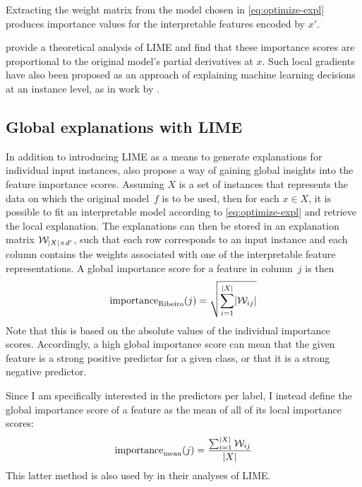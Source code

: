 Extracting the weight matrix from the model chosen in \autoref{eq:optimize-expl} produces importance values for the interpretable features encoded by $x'$.

\citet{garreau2020explaining} provide a theoretical analysis of LIME and find that these importance scores are proportional to the original model's partial derivatives at $x$.
Such local gradients have also been proposed as an approach of explaining machine learning decisions at an instance level, as in work by \citet{baehrens2010explain}.

\subsection{Global explanations with LIME}
\label{sec:ml-lime-global}

In addition to introducing LIME as a means to generate explanations for individual input instances, \citet{ribeiro2016lime} also propose a way of gaining global insights into the feature importance scores.
Assuming $X$ is a set of instances that represents the data on which the original model~$f$ is to be used,
then for each $x \in X$, it is possible to fit an interpretable model according to \autoref{eq:optimize-expl} and retrieve the local explanation.
The explanations can then be stored in an explanation matrix $\mathcal{W}_{\lvert{}X\rvert \times d'}$, such that each row corresponds to an input instance and each column contains the weights associated with one of the interpretable feature representations.
A global importance score for a feature in column~$j$ is then
\begin{equation}
\label{eq:global-sqrt}
    \text{importance}_{\text{Ribeiro}}(j) = \sqrt{\sum_{i=1}^{\lvert{}X\rvert} \lvert{}\mathcal{W}_{ij}\rvert}
\end{equation}
Note that this is based on the absolute values of the individual importance scores.
Accordingly, a high global importance score can mean that the given feature is a strong positive predictor for a given class, or that it is a strong negative predictor.

Since I am specifically interested in the predictors per label, I instead define the global importance score of a feature as the mean of all of its local importance scores:
\begin{equation}
\label{eq:global-mean}
    \text{importance}_{\text{mean}}(j) = \frac{\sum_{i=1}^{\lvert{}X\rvert}\mathcal{W}_{ij}}{\lvert{}X\rvert}
\end{equation}
This latter method is also used by \citet{garreau2020explaining} in their analyses of LIME.

